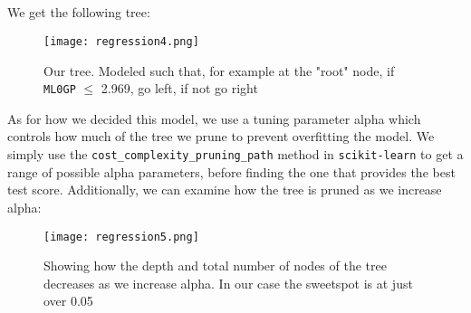 \documentclass{article}
\begin{document}
\subsection{}
We get the following tree:
\begin{figure}[ht!]
    \centering
    \texttt{[image: regression4.png]}
    \caption{Our tree. Modeled such that, for example at the "root" node, if \texttt{ML0GP} $\leq$ 2.969, go left, if not go right}
    \label{figR4}
\end{figure} \newline
As for how we decided this model, we use a tuning parameter alpha which controls how much of the tree we prune to prevent overfitting the model. We simply use the \texttt{cost\_complexity\_pruning\_path} method in \texttt{scikit-learn} to get a range of possible alpha parameters, before finding the one that provides the best test score. \newpage Additionally, we can examine how the tree is pruned as we increase alpha:
\begin{figure}[ht!]
    \centering
    \texttt{[image: regression5.png]}
    \caption{Showing how the depth and total number of nodes of the tree decreases as we increase alpha. In our case the sweetspot is at just over 0.05}
    \label{figR5}
\end{figure} \newline
\end{document}
